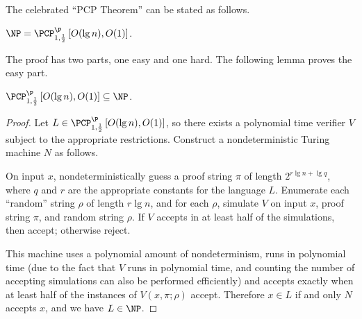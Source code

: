 \documentclass[]{article}
\newcommand{\PCPcs}[5]{\PCP^{#1}_{#2, #3}\left[#4, #5\right]}
\begin{document}
The celebrated ``PCP Theorem'' can be stated as follows.
\begin{theorem}
  $\NP = \PCPcs{\P}{1}{\frac{1}{2}}{O(\lg n)}{O(1)}$.
\end{theorem}
The proof has two parts, one easy and one hard.
The following lemma proves the easy part.
\begin{lemma}\label{lem:pcpinnp}
  $\PCPcs{\P}{1}{\frac{1}{2}}{O(\lg n)}{O(1)} \subseteq \NP$.
\end{lemma}
\begin{proof}
  Let $L \in \PCPcs{\P}{1}{\frac{1}{2}}{O(\lg n)}{O(1)}$, so there exists a polynomial time \PCP{} verifier $V$ subject to the appropriate restrictions.
  Construct a nondeterministic Turing machine $N$ as follows.

  On input $x$, nondeterministically guess a proof string $\pi$ of length $2^{r \lg n + \lg q}$, where $q$ and $r$ are the appropriate constants for the language $L$.
  Enumerate each ``random'' string $\rho$ of length $r \lg  n$, and for each $\rho$, simulate $V$ on input $x$, proof string $\pi$, and random string $\rho$.
  If $V$ accepts in at least half of the simulations, then accept; otherwise reject.

  This machine uses a polynomial amount of nondeterminism, runs in polynomial time (due to the fact that $V$ runs in polynomial time, and counting the number of accepting simulations can also be performed efficiently) and accepts exactly when at least half of the instances of $V(x, \pi; \rho)$ accept.
  Therefore $x \in L$ if and only $N$ accepts $x$, and we have $L \in \NP$.  
\end{proof}
\end{document}
